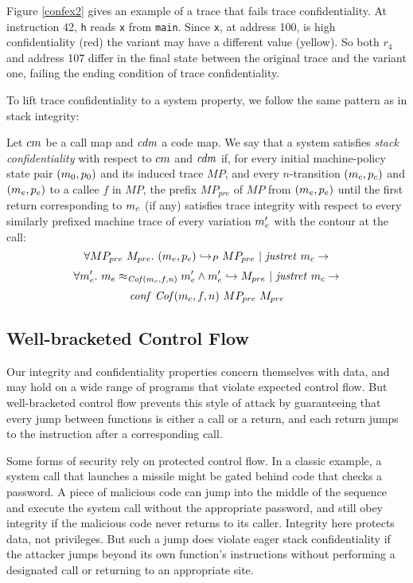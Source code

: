 \documentclass[acmsmall,review,anonymous]{acmart}\settopmatter{printfolios=true,printccs=false,printacmref=false}
\begin{document}
Figure \ref{confex2} gives an example of a trace that fails trace
confidentiality. At instruction 42, {\tt h} reads {\tt x} from {\tt main}.
Since {\tt x}, at address 100, is high confidentiality (red) the variant
may have a different value (yellow). So both \(r_4\) and address 107
differ in the final state between the original trace and the variant one,
failing the ending condition of trace confidentiality.

To lift trace confidentiality to a system property, we follow the same
pattern as in stack integrity:

Let $cm$ be a call map and $\mathit{cdm}$ a code map. We say that a
system satisfies {\em stack confidentiality} with respect to
$cm$ and $\mathit{cdm}$ if, for every initial machine-policy state
pair $(m_0, p_0)$ and its induced trace $MP$, and every
$n$-transition $(m_c, p_c)$ and $(m_e, p_e)$ to a callee
$f$ in $MP$, the prefix $MP_{pre}$ of $MP$ from $(m_e, p_e)$
until the first return corresponding to $m_c$ (if any) satisfies
trace integrity with respect to every similarly prefixed machine trace
of every variation $m_e'$ with the contour at the call:
$$\forall MP_{pre} ~ M_{pre}. ~
(m_e,p_e) \hookrightarrow_P MP_{pre} ~ | ~ \mathit{justret}\ m_c \rightarrow$$
$$\forall m_e'. ~ m_e \approx_{\mathit{Cof}(m_c, f, n)} m_e' \wedge
m_e' \hookrightarrow M_{pre} ~ | ~ \mathit{justret}\ m_c \rightarrow$$
$$\mathit{conf}~\mathit{Cof}(m_c, f, n) ~ MP_{pre} ~ M_{pre}$$

\subsection{Well-bracketed Control Flow}
\label{sec:wbcf}

Our integrity and confidentiality properties concern themselves with
data, and may hold on a wide range of programs that violate expected
control flow.  But well-bracketed control flow prevents this style of
attack by guaranteeing that every jump between functions is either a
call or a return, and each return jumps to the instruction after a
corresponding call.

    Some forms of security rely on protected control flow. In a classic
    example, a system call that launches a missile might be gated behind code
    that checks a password. A piece of malicious code can jump into the middle
    of the sequence and execute the system call without the appropriate password,
    and still obey integrity if the malicious code never returns to its caller.
    Integrity here protects data, not privileges. But such a jump does violate
    eager stack confidentiality if the attacker jumps beyond its own function's
    instructions without performing a designated call or returning to an
    appropriate site.
\end{document}
